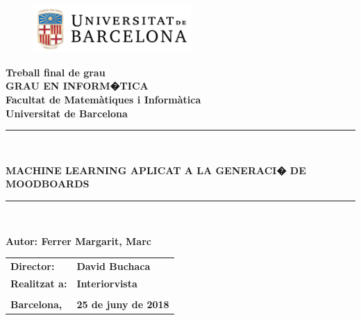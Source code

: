 \documentclass[12pt,a4paper,openright,oneside]{article}
\numberwithin{equation}{section}
\theoremstyle{definition}
\begin{document}

\thispagestyle{empty}

\begin{titlepage}
\begin{center}
\begin{figure}[htb]
\begin{center}
\includegraphics[width=6cm]{ub_color.pdf}
\end{center}
\end{figure}

\textbf{\LARGE Treball final de grau} \\
\vspace*{.5cm}
\textbf{\LARGE GRAU EN INFORM�TICA } \\
\vspace*{.5cm}
\textbf{\LARGE Facultat de Matem\`atiques i Inform\`atica \\ Universitat de Barcelona} \\
\vspace*{1.5cm}
\rule{16cm}{0.1mm}\\
\begin{Huge}
\textbf{MACHINE LEARNING APLICAT A  LA GENERACI� DE MOODBOARDS} \\
\end{Huge}
\rule{16cm}{0.1mm}\\

\vspace{1cm}

\begin{center}
\textbf{\LARGE Autor: Ferrer Margarit, Marc}

\vspace*{2cm}

\renewcommand{\arraystretch}{1.5}
\begin{tabular}{ll}
\textbf{\Large Director:} & \textbf{\Large David Buchaca } \\
\textbf{\Large Realitzat a:} & \textbf{\Large  Interiorvista   } \\
 & \textbf{\Large} \\
\textbf{\Large Barcelona,} & \textbf{\Large 25 de juny de 2018 }
\end{tabular}

\end{center}

\end{center}

\end{titlepage}
\end{document}

